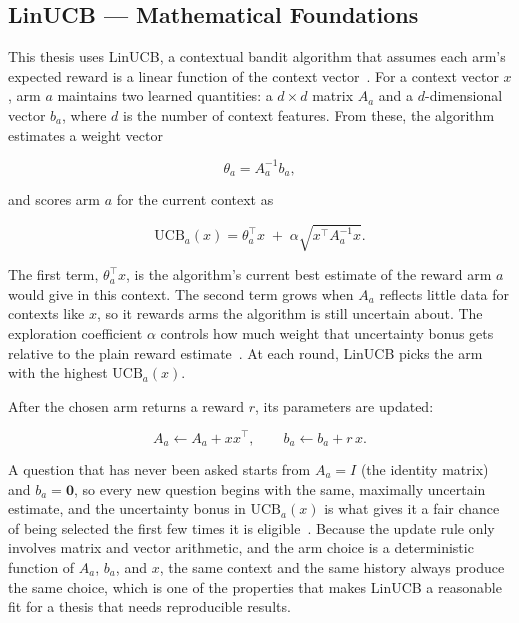 \documentclass[a4paper, 12pt, oneside, openany, BCOR1cm,toc=chapterentrywithdots]{scrbook}
\begin{document}

\subsection{LinUCB --- Mathematical Foundations}

This thesis uses LinUCB, a contextual bandit algorithm that assumes each arm's expected reward is
a linear function of the context vector~\cite{li2010contextual,huang2016linucb}. For a context
vector $x$, arm $a$ maintains two learned quantities: a $d \times d$ matrix $A_a$ and a
$d$-dimensional vector $b_a$, where $d$ is the number of context features. From these, the
algorithm estimates a weight vector

\[
\theta_a = A_a^{-1} b_a ,
\]

and scores arm $a$ for the current context as

\[
\mathrm{UCB}_a(x) = \theta_a^\top x \; + \; \alpha \sqrt{x^\top A_a^{-1} x} .
\]

The first term, $\theta_a^\top x$, is the algorithm's current best estimate of the reward arm $a$
would give in this context. The second term grows when $A_a$ reflects little data for contexts
like $x$, so it rewards arms the algorithm is still uncertain about. The exploration coefficient
$\alpha$ controls how much weight that uncertainty bonus gets relative to the plain reward
estimate~\cite{li2010contextual}. At each round, LinUCB picks the arm with the highest
$\mathrm{UCB}_a(x)$.

After the chosen arm returns a reward $r$, its parameters are updated:

\[
A_a \leftarrow A_a + x x^\top , \qquad b_a \leftarrow b_a + r\, x .
\]

A question that has never been asked starts from $A_a = I$ (the identity matrix) and $b_a =
\mathbf{0}$, so every new question begins with the same, maximally uncertain estimate, and the
uncertainty bonus in $\mathrm{UCB}_a(x)$ is what gives it a fair chance of being selected the
first few times it is eligible~\cite{li2010contextual}. Because the update rule only involves
matrix and vector arithmetic, and the arm choice is a deterministic function of $A_a$, $b_a$, and
$x$, the same context and the same history always produce the same choice, which is one of the
properties that makes LinUCB a reasonable fit for a thesis that needs reproducible results.
\end{document}
